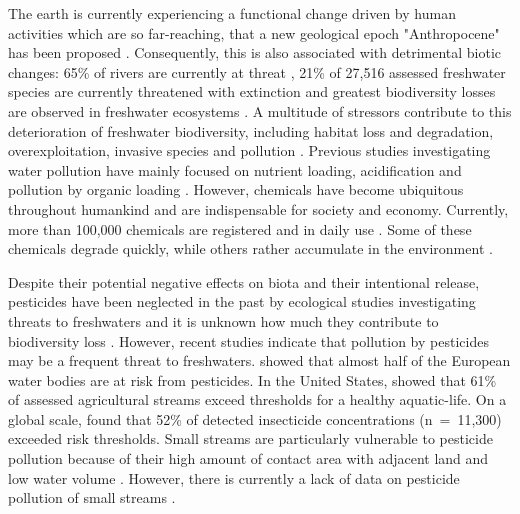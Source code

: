 The earth is currently experiencing a functional change driven by human activities which are so far-reaching, that a new geological epoch "Anthropocene" has been proposed \citep{crutzen_geology_2002, steffen_anthropocene:global_2011, waters_anthropocene_2016}. 
Consequently, this is also associated with detrimental biotic changes: 65\% of rivers are currently at threat \citep{vorosmarty_global_2010}, 21\% of 27,516 assessed freshwater species are currently threatened with extinction \citep{iucn_iucn_2016} and greatest biodiversity losses are observed in freshwater ecosystems \citep{wwf_living_2016}. 
A multitude of stressors contribute to this deterioration of freshwater biodiversity, including habitat loss and degradation, overexploitation, invasive species and pollution \citep{dudgeon_freshwater_2006, vorosmarty_global_2010, wwf_living_2016, collen_global_2014}. 
Previous studies investigating water pollution have mainly focused on nutrient loading, acidification and pollution by organic loading \citep{schafer_contribution_2016}. 
However, chemicals have become ubiquitous throughout humankind and are indispensable for society and economy. 
Currently, more than 100,000 chemicals are registered and in daily use \citep{schwarzman_new_2009, schwarzenbach_global_2010}.
Some of these chemicals degrade quickly, while others rather accumulate in the environment \citep{fenner_evaluating_2013}.

Despite their potential negative effects on biota and their intentional release, pesticides have been neglected in the past by ecological studies investigating threats to freshwaters \citep{schafer_contribution_2016} and it is unknown how much they contribute to biodiversity loss \citep{rockstrom_safe_2009, persson_confronting_2013}. 
However, recent studies indicate that pollution by pesticides may be a frequent threat to freshwaters.
\citet{malaj_organic_2014} showed that almost half of the European water bodies are at risk from pesticides. 
In the United States, \citet{stone_pesticides_2014} showed that 61\% of assessed agricultural streams exceed thresholds for a healthy aquatic-life.
On a global scale, \citet{stehle_pesticide_2015} found that 52\% of detected insecticide concentrations (n~=~11,300) exceeded risk thresholds.
Small streams are particularly vulnerable to pesticide pollution because of their high amount of contact area with adjacent land and low water volume \citep{biggs_importance_2016}.
However, there is currently a lack of data on pesticide pollution of small streams \citep{lorenz_specifics_2016}. 


